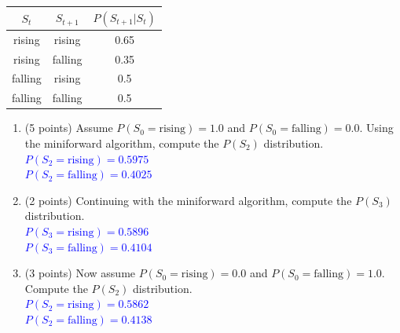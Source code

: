 \documentclass[12pt]{article}
\newenvironment{qparts}{\begin{enumerate}[{(}a{)}]}{\end{enumerate}}
\begin{document}
\begin{center}
  \begin{tabular}{||c|c|c||}
    \hline
    $S_t$   & $S_{t+1}$ & $P(S_{t+1} | S_t)$ \\
    \hline\hline
    rising  & rising    & 0.65               \\
    \hline
    rising  & falling   & 0.35               \\
    \hline
    falling & rising    & 0.5                \\
    \hline
    falling & falling   & 0.5                \\
    \hline
  \end{tabular}
\end{center}


\begin{qparts}
  \item (5 points)
  Assume $P(S_0=\mbox{rising})=1.0$ and
  $P(S_0=\mbox{falling})=0.0$.
  Using the miniforward algorithm,
  compute the $P(S_2)$ distribution.\\
  \textcolor{blue}{$P(S_2=\mbox{rising}) = 0.5975$\\
    $P(S_2=\mbox{falling}) = 0.4025$}
  \vspace{1em}

  \item (2 points)
  Continuing with the miniforward algorithm,
  compute the $P(S_3)$ distribution.\\
  \textcolor{blue}{$P(S_3=\mbox{rising}) = 0.5896$\\
    $P(S_3=\mbox{falling}) = 0.4104$}
  \vspace{1em}

  \item (3 points)
  Now assume $P(S_0=\mbox{rising})=0.0$ and
  $P(S_0=\mbox{falling})=1.0$.
  Compute the $P(S_2)$ distribution.\\
  \textcolor{blue}{$P(S_2=\mbox{rising}) = 0.5862$\\
    $P(S_2=\mbox{falling}) = 0.4138$}

  \vspace{3em}



\end{qparts}
\end{document}
